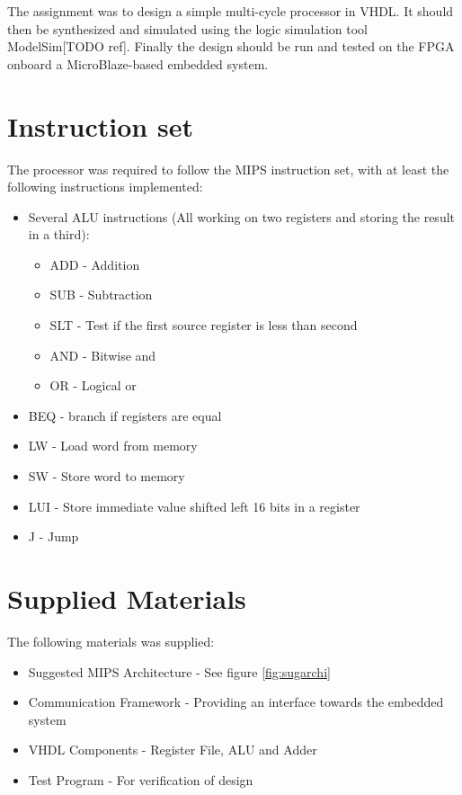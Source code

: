 The assignment was to design a simple multi-cycle processor in VHDL.
It should then be synthesized and simulated using the logic simulation tool ModelSim[TODO ref].
Finally the design should be run and tested on the FPGA onboard a MicroBlaze-based embedded system.

\section{Instruction set}
The processor was required to follow the MIPS instruction set, with at least the following instructions implemented:
\begin{itemize}
    \item Several ALU instructions (All working on two registers and storing the result in a third):
        \begin{itemize}
            \item ADD - Addition
            \item SUB - Subtraction
            \item SLT - Test if the first source register is less than second
            \item AND - Bitwise and
            \item OR  - Logical or
        \end{itemize}
    \item BEQ - branch if registers are equal
    \item LW - Load word from memory
    \item SW - Store word to memory
    \item LUI - Store immediate value shifted left 16 bits in a register
    \item J - Jump
\end{itemize}

\section{Supplied Materials}
The following materials was supplied:
\begin{itemize}
    \item Suggested MIPS Architecture - See figure \ref{fig:sugarchi}
    \item Communication Framework - Providing an interface towards the embedded system
    \item VHDL Components - Register File, ALU and Adder
    \item Test Program - For verification of design
\end{itemize}

